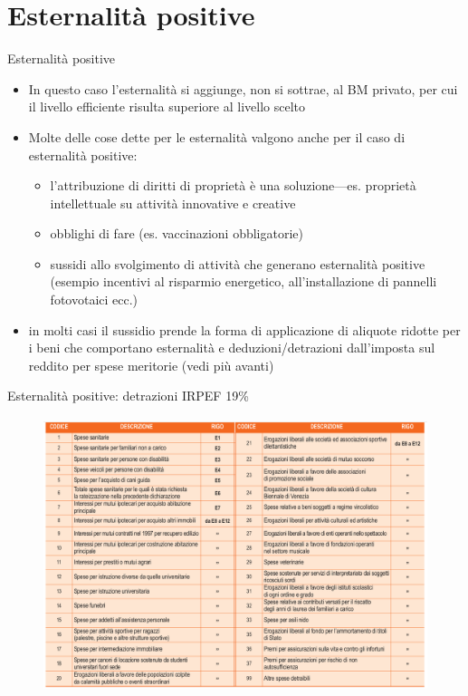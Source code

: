 \documentclass[aspectratio=64,11pt]{beamer}
\begin{document}
\section{Esternalità positive}

\begin{frame}{Esternalità positive}
\begin{itemize}
\item In questo caso l'esternalità si aggiunge, non si sottrae, al BM privato, per cui il livello efficiente risulta \alert{superiore} al livello scelto
\item Molte delle cose dette per le esternalità valgono anche per il caso di esternalità positive:
\begin{itemize}
\item l'attribuzione di diritti di proprietà è una soluzione---es. proprietà intellettuale su attività innovative e creative
\item obblighi di fare (es. vaccinazioni obbligatorie)
\item sussidi allo svolgimento di attività che generano esternalità positive (esempio incentivi al risparmio energetico, all'installazione di pannelli fotovotaici ecc.)
\end{itemize}
\item in molti casi il sussidio prende la forma di applicazione di \alert{aliquote ridotte} per i beni che comportano esternalità e deduzioni/detrazioni dall'imposta sul reddito per spese meritorie (vedi più avanti)
\end{itemize}
\end{frame}

\begin{frame}{Esternalità positive: detrazioni IRPEF 19\%}
\begin{figure}[htbp]
\centering
\includegraphics[height=8cm]{./figure/detrazioni-spese-730.png}
\end{figure}
\end{frame}
\end{document}

